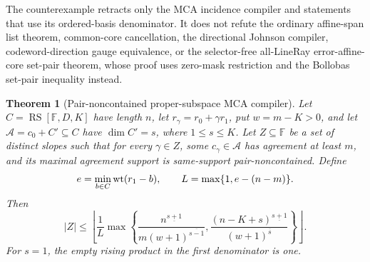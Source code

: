 \documentclass[11pt,a4paper]{amsart}
\numberwithin{equation}{section}
\newtheorem{theorem}{Theorem}[section]
\theoremstyle{remark}
\DeclareMathOperator{\RS}{RS}\DeclareMathOperator{\MCA}{MCA}\DeclareMathOperator{\CA}{CA}
\newcommand{\F}{\mathbb F}\newcommand{\B}{\mathbb B}\newcommand{\K}{\mathbb K}\newcommand{\Z}{\mathbb Z}
\begin{document}
\begin{remark}
The counterexample retracts only the MCA incidence compiler and statements
that use its ordered-basis denominator.  It does not refute the ordinary
affine-span list theorem, common-core cancellation, the directional Johnson
compiler, codeword-direction gauge equivalence, or the selector-free
all-LineRay error-affine-core set-pair theorem, whose proof uses zero-mask
restriction and the Bollobas set-pair inequality instead.
\end{remark}

\begin{theorem}[Pair-noncontained proper-subspace MCA compiler]
\label{thm:proper-subspace-mca}
Let \(C=\RS[\F,D,K]\) have length \(n\), let
\(r_\gamma=r_0+\gamma r_1\), put \(w=m-K>0\), and let
\(\mathcal A=c_0+C'\subseteq C\) have \(\dim C'=s\), where
\(1\le s\le K\).  Let \(Z\subseteq\F\) be a set of distinct slopes such
that for every \(\gamma\in Z\), some \(c_\gamma\in\mathcal A\) has
agreement at least \(m\), and its maximal agreement support is
same-support pair-noncontained.  Define
\[
 e=\min_{b\in C}\operatorname{wt}(r_1-b),\qquad
 L=\max\{1,e-(n-m)\}.
\]
Then
\begin{equation}
 |Z|\le\left\lfloor\frac1L\max\left\{
 \frac{n^{\underline{s+1}}}
      {m(w+1)^{\overline{s-1}}},
 \frac{(n-K+s)^{\underline{s+1}}}
      {(w+1)^{\overline s}}
 \right\}\right\rfloor .
 \label{eq:proper-subspace-mca}
\end{equation}
For \(s=1\), the empty rising product in the first denominator is one.
\end{theorem}
\end{document}
